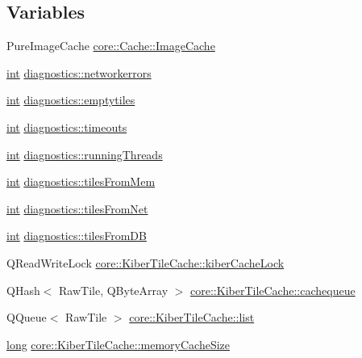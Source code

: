 \subsection*{Variables}
\begin{DoxyCompactItemize}
\item 
Pure\-Image\-Cache \hyperlink{group___o_p_map_widget_gab71cf242d304174673b1385ade1915bd}{core\-::\-Cache\-::\-Image\-Cache}
\item 
\hyperlink{ioapi_8h_a787fa3cf048117ba7123753c1e74fcd6}{int} \hyperlink{group___o_p_map_widget_ga818b2b21d317fac5193b04d2c0e32c82}{diagnostics\-::networkerrors}
\item 
\hyperlink{ioapi_8h_a787fa3cf048117ba7123753c1e74fcd6}{int} \hyperlink{group___o_p_map_widget_ga34fe3ec60c45212857e46367009f0729}{diagnostics\-::emptytiles}
\item 
\hyperlink{ioapi_8h_a787fa3cf048117ba7123753c1e74fcd6}{int} \hyperlink{group___o_p_map_widget_ga9f4f4d5bc0d01d665175028f4ea970c7}{diagnostics\-::timeouts}
\item 
\hyperlink{ioapi_8h_a787fa3cf048117ba7123753c1e74fcd6}{int} \hyperlink{group___o_p_map_widget_gae7dc693c162396310de691f67b4b0e99}{diagnostics\-::running\-Threads}
\item 
\hyperlink{ioapi_8h_a787fa3cf048117ba7123753c1e74fcd6}{int} \hyperlink{group___o_p_map_widget_gade3ce38dee3744ba9c72ca0dce86b0d4}{diagnostics\-::tiles\-From\-Mem}
\item 
\hyperlink{ioapi_8h_a787fa3cf048117ba7123753c1e74fcd6}{int} \hyperlink{group___o_p_map_widget_ga6750459fc54ae81a5870b841aff67c6c}{diagnostics\-::tiles\-From\-Net}
\item 
\hyperlink{ioapi_8h_a787fa3cf048117ba7123753c1e74fcd6}{int} \hyperlink{group___o_p_map_widget_ga1a83442bf140e95b84931d57cc849449}{diagnostics\-::tiles\-From\-D\-B}
\item 
Q\-Read\-Write\-Lock \hyperlink{group___o_p_map_widget_ga33731aa2cecd7ba1200e9871f3380308}{core\-::\-Kiber\-Tile\-Cache\-::kiber\-Cache\-Lock}
\item 
Q\-Hash$<$ Raw\-Tile, Q\-Byte\-Array $>$ \hyperlink{group___o_p_map_widget_ga632c3be1045d7e97d09885aba0c18100}{core\-::\-Kiber\-Tile\-Cache\-::cachequeue}
\item 
Q\-Queue$<$ Raw\-Tile $>$ \hyperlink{group___o_p_map_widget_ga097b545fed7bd5b8be78160165f4f6f5}{core\-::\-Kiber\-Tile\-Cache\-::list}
\item 
\hyperlink{ioapi_8h_a3c7b35ad9dab18b8310343c201f7b27e}{long} \hyperlink{group___o_p_map_widget_gae96e4700fe984a52afd8c8016dc1295b}{core\-::\-Kiber\-Tile\-Cache\-::memory\-Cache\-Size}

\end{DoxyCompactItemize}
